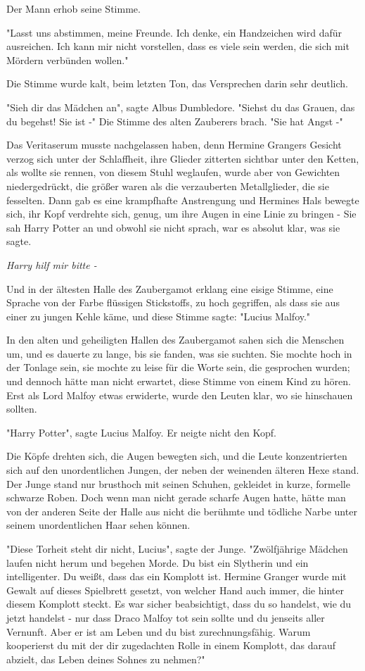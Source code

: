 {Der Mann erhob seine Stimme.

"Lasst uns abstimmen, meine Freunde. Ich denke, ein Handzeichen wird dafür ausreichen. Ich kann mir nicht vorstellen, dass es viele sein werden, die sich mit Mördern verbünden wollen."

Die Stimme wurde kalt, beim letzten Ton, das Versprechen darin sehr deutlich.

"Sieh dir das Mädchen an", sagte Albus Dumbledore. "Siehst du das Grauen, das du begehst! Sie ist -" Die Stimme des alten Zauberers brach. "Sie hat Angst -"

Das Veritaserum musste nachgelassen haben, denn Hermine Grangers Gesicht verzog sich unter der Schlaffheit, ihre Glieder zitterten sichtbar unter den Ketten, als wollte sie rennen, von diesem Stuhl weglaufen, wurde aber von Gewichten niedergedrückt, die größer waren als die verzauberten Metallglieder, die sie fesselten. Dann gab es eine krampfhafte Anstrengung und Hermines Hals bewegte sich, ihr Kopf verdrehte sich, genug, um ihre Augen in eine Linie zu bringen - Sie sah Harry Potter an und obwohl sie nicht sprach, war es absolut klar, was sie sagte.

\emph{Harry hilf mir bitte -}

Und in der ältesten Halle des Zaubergamot erklang eine eisige Stimme, eine Sprache von der Farbe flüssigen Stickstoffs, zu hoch gegriffen, als dass sie aus einer zu jungen Kehle käme, und diese Stimme sagte: "Lucius Malfoy."

In den alten und geheiligten Hallen des Zaubergamot sahen sich die Menschen um, und es dauerte zu lange, bis sie fanden, was sie suchten. Sie mochte hoch in der Tonlage sein, sie mochte zu leise für die Worte sein, die gesprochen wurden; und dennoch hätte man nicht erwartet, diese Stimme von einem Kind zu hören. Erst als Lord Malfoy etwas erwiderte, wurde den Leuten klar, wo sie hinschauen sollten.

"Harry Potter", sagte Lucius Malfoy. Er neigte nicht den Kopf.

Die Köpfe drehten sich, die Augen bewegten sich, und die Leute konzentrierten sich auf den unordentlichen Jungen, der neben der weinenden älteren Hexe stand. Der Junge stand nur brusthoch mit seinen Schuhen, gekleidet in kurze, formelle schwarze Roben. Doch wenn man nicht gerade scharfe Augen hatte, hätte man von der anderen Seite der Halle aus nicht die berühmte und tödliche Narbe unter seinem unordentlichen Haar sehen können.

"Diese Torheit steht dir nicht, Lucius", sagte der Junge. "Zwölfjährige Mädchen laufen nicht herum und begehen Morde. Du bist ein Slytherin und ein intelligenter. Du weißt, dass das ein Komplott ist. Hermine Granger wurde mit Gewalt auf dieses Spielbrett gesetzt, von welcher Hand auch immer, die hinter diesem Komplott steckt. Es war sicher beabsichtigt, dass du so handelst, wie du jetzt handelst - nur dass Draco Malfoy tot sein sollte und du jenseits aller Vernunft. Aber er ist am Leben und du bist zurechnungsfähig. Warum kooperierst du mit der dir zugedachten Rolle in einem Komplott, das darauf abzielt, das Leben deines Sohnes zu nehmen?"

}
